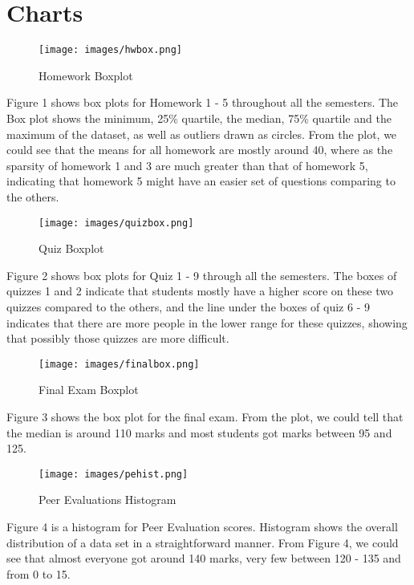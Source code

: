 \documentclass{article}
\begin{document}
\section{Charts}
\begin{figure}[h]
    \centering
    \texttt{[image: images/hwbox.png]}
    \caption{Homework Boxplot}
\end{figure}
\begin{flushleft}
Figure 1 shows box plots for Homework 1 - 5 throughout all the semesters. The Box plot shows the minimum, 25\% quartile, the median, 75\% quartile and the maximum of the dataset, as well as outliers drawn as circles. From the plot, we could see that the means for all homework are mostly around 40, where as the sparsity of homework 1 and 3 are much greater than that of homework 5, indicating that homework 5 might have an easier set of questions comparing to the others.
\end{flushleft}
\begin{figure}[h]
    \centering
    \texttt{[image: images/quizbox.png]}
    \caption{Quiz Boxplot}
\end{figure}
\begin{flushleft}
Figure 2 shows box plots for Quiz 1 - 9 through all the semesters. The boxes of quizzes 1 and 2 indicate that students mostly have a higher score on these two quizzes compared to the others, and the line under the boxes of quiz 6 - 9 indicates that there are more people in the lower range for these quizzes, showing that possibly those quizzes are more difficult.
\end{flushleft}
\begin{figure}[h]
    \centering
    \texttt{[image: images/finalbox.png]}
    \caption{Final Exam Boxplot}
\end{figure}
\begin{flushleft}
Figure 3 shows the box plot for the final exam. From the plot, we could tell that the median is around 110 marks and most students got marks between 95 and 125.
\end{flushleft}
\newpage
\begin{figure}[h]
    \centering
    \texttt{[image: images/pehist.png]}
    \caption{Peer Evaluations Histogram}
\end{figure}
\begin{flushleft}
Figure 4 is a histogram for Peer Evaluation scores. Histogram shows the overall distribution of a data set in a straightforward manner. From Figure 4, we could see that almost everyone got around 140 marks, very few between 120 - 135 and from 0 to 15.
\end{flushleft}
\end{document}
